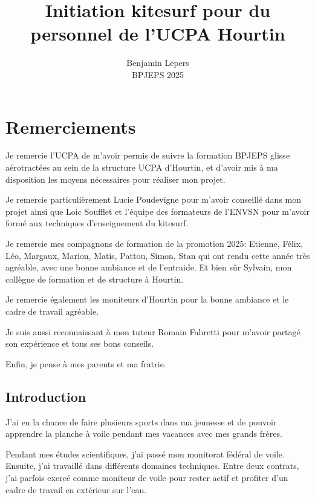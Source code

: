 \documentclass[11pt,a4paper]{report}
\begin{document}
\author{Benjamin Lepers \\ BPJEPS 2025 }
\title{Initiation kitesurf pour du personnel de l'UCPA Hourtin}
\maketitle
\chapter*{Remerciements}

Je remercie l'UCPA de m'avoir permis de suivre la formation
BPJEPS glisse aérotractées au sein de la structure UCPA
d'Hourtin, et d'avoir mis à ma disposition les moyens nécessaires
pour réaliser mon projet.
 
Je remercie particulièrement Lucie Poudevigne pour m'avoir
conseillé  dans mon projet ainsi que Loic Soufflet et l'équipe des
formateurs de l'ENVSN pour m'avoir formé aux techniques
d'enseignement du kitesurf.

Je remercie mes compagnons de formation de la promotion 2025:
Etienne, Félix, Léo, Margaux, Marion, Matis, Pattou,
Simon, Stan qui ont rendu cette année très agréable,
avec une  bonne ambiance et de l'entraide.
Et bien s\^ur Sylvain, mon collègue de formation et 
de structure à Hourtin.

Je remercie également les moniteurs d'Hourtin  pour la
bonne ambiance et le cadre de travail agréable.

Je suis aussi reconnaissant à  mon tuteur Romain Fabretti
pour m'avoir partagé son expérience et tous ses bons conseils.

Enfin, je pense à  mes parents et ma fratrie.

\tableofcontents
\newpage
\section{Introduction}

J'ai eu la chance de faire plusieurs sports dans ma jeunesse et de pouvoir apprendre la planche à voile pendant mes vacances avec mes grands frères.

Pendant mes études scientifiques, j'ai passé
mon monitorat fédéral de voile. Ensuite, j'ai travaillé dans différents
domaines techniques. Entre deux contrats, j'ai parfois exercé comme 
moniteur de voile pour rester actif et profiter d'un cadre de travail
en extérieur sur l'eau.

\end{document}
